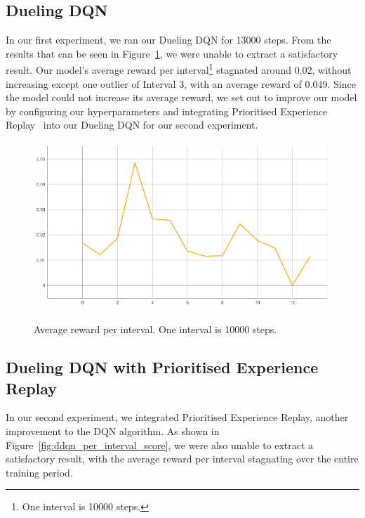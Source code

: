 \documentclass[12pt,a4paper]{article}
\begin{document}
    \subsection{Dueling DQN}\label{subsec:dueling-dqn}
    In our first experiment, we ran our Dueling DQN for 13000 steps.
    From the results that can be seen in Figure~\ref{fig:ddqn_interval_score}, we were unable to extract a satisfactory result.
    Our model's average reward per interval\footnote{One interval is 10000 steps.} stagnated around 0.02, without increasing except one outlier of Interval 3, with an average reward of 0.049.
    Since the model could not increase its average reward, we set out to improve our model by configuring our hyperparameters and integrating Prioritised Experience Replay~\citet{schaul16} into our Dueling DQN for our second experiment.
    \begin{figure}[H]
        \caption[DDQN: Average reward per interval.]{Average reward per interval. One interval is 10000 steps.}
        \centering
        \includegraphics[scale=0.5]{interval_score_ddqn}
        \label{fig:ddqn_interval_score}
    \end{figure}

    \subsection{Dueling DQN with Prioritised Experience Replay}\label{subsec:dueling-dqn-with-prioritised-experience-replay}
    In our second experiment, we integrated Prioritised Experience Replay, another improvement to the DQN algorithm.
    As shown in Figure~\ref{fig:ddqn_per_interval_score}, we were also unable to extract a satisfactory result, with the average reward per interval stagnating over the entire training period.
\end{document}
